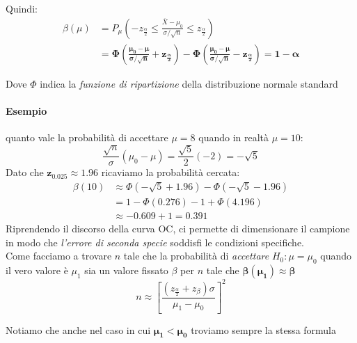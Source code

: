 \documentclass[]{article}
\begin{document}
    Quindi:
    \begin{equation*}
        \begin{split}
            \beta(\mu) &= P_\mu \left( -z_{\frac{\alpha}{2}} \leq \frac{\overline{X} - \mu_0}{\sigma / \sqrt{n}} \leq z_{\frac{\alpha}{2}} \right) \\
            &= \boldsymbol{\Phi \left( \frac{\mu_0 - \mu}{\sigma / \sqrt{n}} + z_{\frac{\alpha}{2}}\right) - \Phi \left( \frac{\mu_0 - \mu}{\sigma / \sqrt{n}} - z_{\frac{\alpha}{2}} \right) = 1 - \alpha}
        \end{split}
    \end{equation*}
    \centerline{Dove $\Phi$ indica la \textit{funzione di ripartizione} della distribuzione normale standard}
    \paragraph{Esempio} quanto vale la probabilità di accettare $\mu = 8$ quando in realtà $\mu = 10$:
    \[ \frac{\sqrt{n}}{\sigma} (\mu_0 - \mu) = \frac{\sqrt{5}}{2} (-2) = - \sqrt{5} \]
    Dato che $\boldsymbol{z_{0.025} \approx 1.96}$ ricaviamo la probabilità cercata:
    \begin{equation*}
        \begin{split}
            \beta(10) &\approx \Phi(- \sqrt{5} + 1.96) - \Phi(- \sqrt{5} - 1.96) \\
            &= 1 - \Phi(0.276) - 1 + \Phi(4.196) \\
            &\approx -0.609 + 1 = \boldsymbol{0.391}
        \end{split}
    \end{equation*}
    Riprendendo il discorso della curva OC, ci permette di dimensionare il campione in modo che \textit{l'errore di seconda specie} soddisfi le condizioni specifiche. \\[2ex]
    Come facciamo a trovare $n$ tale che la probabilità di \textit{accettare} $H_0 : \mu = \mu_0$ quando il vero valore è $\mu_1$ sia un valore fissato $\beta$ per $n$ tale che $\boldsymbol{\beta(\mu_1) \approx \beta}$
    \[ n \approx \left[ \frac{(z_{\frac{\alpha}{2}} + z_\beta) \sigma}{\mu_1 - \mu_0} \right]^2 \]
    \centerline{Notiamo che anche nel caso in cui $\boldsymbol{\mu_1 < \mu_0}$ troviamo sempre la stessa formula}
\end{document}
